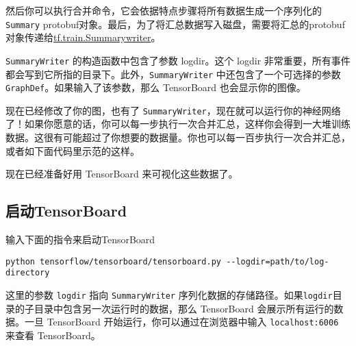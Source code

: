 然后你可以执行合并命令，它会依据特点步骤将所有数据生成一个序列化的\texttt{Summary}
protobuf对象。最后，为了将汇总数据写入磁盘，需要将汇总的protobuf对象传递给\href{../api_docs/python/train.md\#SummaryWriter}{tf.train.Summarywriter}。

\texttt{SummaryWriter} 的构造函数中包含了参数 logdir。这个 logdir
非常重要，所有事件都会写到它所指的目录下。此外，\texttt{SummaryWriter}
中还包含了一个可选择的参数 \texttt{GraphDef}。如果输入了该参数，那么
TensorBoard 也会显示你的图像。

现在已经修改了你的图，也有了
\texttt{SummaryWriter}，现在就可以运行你的神经网络了！如果你愿意的话，你可以每一步执行一次合并汇总，这样你会得到一大堆训练数据。这很有可能超过了你想要的数据量。你也可以每一百步执行一次合并汇总，或者如下面代码里示范的这样。

\begin{Shaded}
\end{Shaded}

现在已经准备好用 TensorBoard 来可视化这些数据了。

\subsection{启动TensorBoard　}\label{ux542fux52a8tensorboard}

输入下面的指令来启动TensorBoard

\begin{verbatim}
python tensorflow/tensorboard/tensorboard.py --logdir=path/to/log-directory
\end{verbatim}

这里的参数 \texttt{logdir} 指向 \texttt{SummaryWriter}
序列化数据的存储路径。如果\texttt{logdir}目录的子目录中包含另一次运行时的数据，那么
TensorBoard 会展示所有运行的数据。一旦 TensorBoard
开始运行，你可以通过在浏览器中输入 \texttt{localhost:6006} 来查看
TensorBoard。

